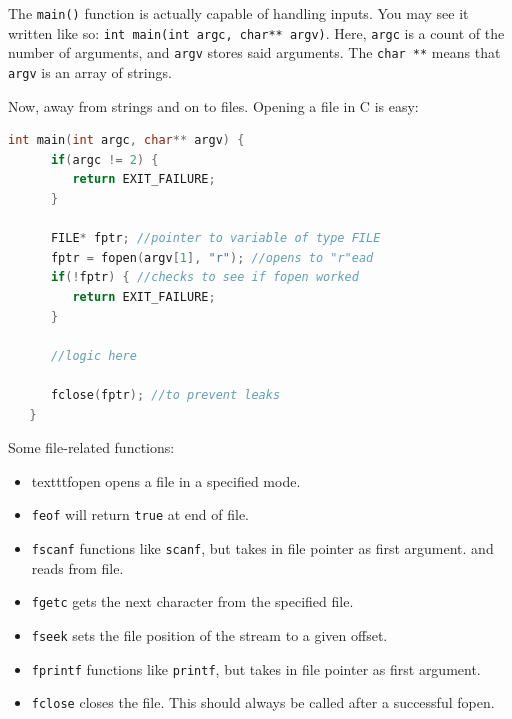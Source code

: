 \documentclass[nobib]{tufte-handout}
\begin{document}
The \texttt{main()} function is actually capable of handling inputs. You
may see it written like so: \texttt{int main(int argc, char** argv)}. Here,
\texttt{argc} is a count of the number of arguments, and \texttt{argv} stores
said arguments. The \texttt{char **} means that \texttt{argv} is an array
of strings. 

Now, away from strings and on to files. Opening a file in C is easy:
\begin{lstlisting}[language=C,caption=fopen]
   int main(int argc, char** argv) {
      if(argc != 2) {
         return EXIT_FAILURE;
      }

      FILE* fptr; //pointer to variable of type FILE
      fptr = fopen(argv[1], "r"); //opens to "r"ead
      if(!fptr) { //checks to see if fopen worked
         return EXIT_FAILURE;
      }

      //logic here

      fclose(fptr); //to prevent leaks
   }
\end{lstlisting}
Some file-related functions:
\begin{itemize}
   \item texttt{fopen} opens a file in a specified mode. 
   \item \texttt{feof} will return \texttt{true} at end of file.
   \item \texttt{fscanf} functions like \texttt{scanf}, but takes in file pointer as first argument.
   and reads from file. 
   \item \texttt{fgetc} gets the next character from the specified file. 
   \item \texttt{fseek} sets the file position of the stream to a given offset.
   \item \texttt{fprintf} functions like \texttt{printf}, but takes in file pointer as first argument. 
   \item \texttt{fclose} closes the file. This should always be called after a successful fopen. 
\end{itemize}
\end{document}
